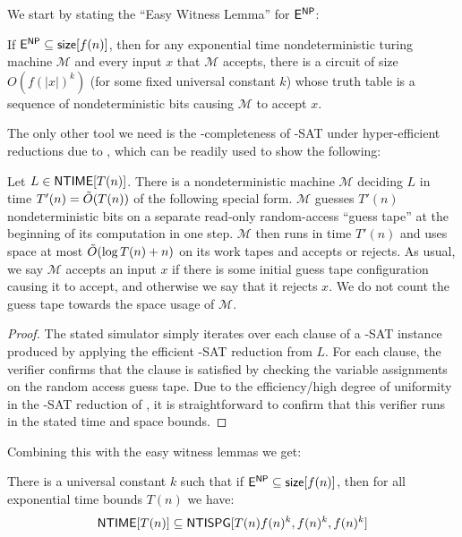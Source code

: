 We start by stating the ``Easy Witness Lemma'' for $\cl{E}^\cl{NP}$:
\begin{lemma}\cite{IKW}
If $\cl{E}^\cl{NP} \subseteq \cl{size}[f(n)]$, then for any exponential time nondeterministic turing machine $\mathcal{M}$ and every input $x$ that $\mathcal{M}$ accepts, there is a circuit of size $O(f(|x|)^k)$ (for some fixed universal constant $k$) whose truth table is a sequence of nondeterministic bits causing $\mathcal{M}$ to accept $x$.
\end{lemma}

The only other tool we need is the -completeness of {-SAT} under hyper-efficient reductions due to \cite{tisp-sat}, which can be readily used to show the following:
\begin{theorem}\label{lossy:thm:3sat}
Let $L \in \cl{NTIME}[T(n)]$. There is a nondeterministic machine $\mathcal{M}$ deciding $L$ in time $T'(n) = \Tilde{O}(T(n))$ of the following special form. $\mathcal{M}$ guesses $T'(n)$ nondeterministic bits on a separate read-only random-access ``guess tape'' at the beginning of its computation in one step. $\mathcal{M}$ then runs in time $T'(n)$ and uses space at most $\Tilde{O}(\log T(n) + n)$ on its work tapes and accepts or rejects. As usual, we say $\mathcal{M}$ accepts an input $x$ if there is some initial guess tape configuration causing it to accept, and otherwise we say that it rejects $x$. We do not count the guess tape towards the space usage of $\mathcal{M}$. 
\end{theorem}
\begin{proof}
The stated simulator simply iterates over each clause of a {-SAT} instance produced by applying the efficient {-SAT} reduction from $L$. For each clause, the verifier confirms that the clause is satisfied by checking the variable assignments on the random access guess tape. Due to the efficiency/high degree of uniformity in the {-SAT} reduction of \cite{tisp-sat}, it is straightforward to confirm that this verifier runs in the stated time and space bounds.
\end{proof}
Combining this with the easy witness lemmas we get:
\begin{theorem}
There is a universal constant $k$ such that if $\cl{E}^\cl{NP} \subseteq \cl{size}[f(n)]$, then for all exponential time bounds $T(n)$ we have:
\[
\cl{NTIME}[T(n)] \subseteq \cl{NTISPG}[T(n)f(n)^k,f(n)^k, f(n)^k]
\]
\end{theorem}
